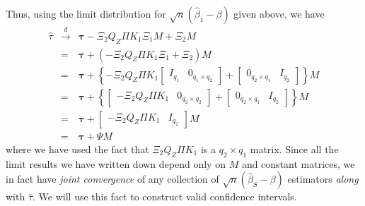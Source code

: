 \documentclass[12pt]{article}
\theoremstyle{definition}
\begin{document}
Thus, using the limit distribution for $\sqrt{n}\left(\widehat{\beta}_1 - \beta \right)$ given above, we have
\begin{eqnarray*}
  \widehat{\tau} &\overset{d}{\rightarrow}& \boldsymbol{\tau}  - \Xi_2 Q_Z \Pi K_1 \Xi_1 M + \Xi_2 M\\
    &=& \boldsymbol{\tau} + (-\Xi_2Q_Z \Pi K_1 \Xi_1 + \Xi_2)M\\
    &=& \boldsymbol{\tau} + \left\{-\Xi_2Q_Z \Pi K_1 
      \left[ \begin{array}{cc}
              I_{q_1} & 0_{q_1 \times q_2}
            \end{array}\right] + \left[ \begin{array}{cc}
              0_{q_2 \times q_1}& I_{q_2}
            \end{array}\right]\right\} M\\
          &=& \boldsymbol{\tau} + \left\{
      \left[ \begin{array}{cc}
              -\Xi_2Q_Z \Pi K_1  & 0_{q_2 \times q_2}
            \end{array}\right] + \left[ \begin{array}{cc}
              0_{q_2 \times q_1}& I_{q_2}
            \end{array}\right]\right\} M\\
          &=&\boldsymbol{\tau}  + \left[ \begin{array}{cc}
              -\Xi_2Q_Z \Pi K_1  & I_{q_2}
            \end{array}\right]M\\
          &=& \boldsymbol{\tau}  + \Psi M
\end{eqnarray*}
where we have used the fact that $\Xi_2Q_Z \Pi K_1 $ is a $q_2\times q_1$ matrix. Since all the limit results we have written down depend only on $M$ and constant matrices, we in fact have \emph{joint convergence} of any collection of $\sqrt{n}\left(\widehat{\beta}_S - \beta \right)$ estimators \emph{along} with $\widehat{\tau}$. We will use this fact to construct valid confidence intervals.
\end{document}
